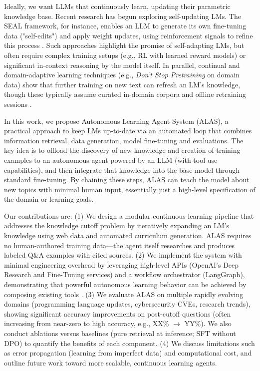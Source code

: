 \documentclass[11pt]{article}
\begin{document}
Ideally, we want LLMs that continuously learn, updating their parametric knowledge base. Recent research has begun exploring self-updating LMs. The SEAL framework, for instance, enables an LLM to generate its own fine-tuning data ("self-edits") and apply weight updates, using reinforcement signals to refine this process \citep{seal2025}. Such approaches highlight the promise of self-adapting LMs, but often require complex training setups (e.g., RL with learned reward models) or significant in-context reasoning by the model itself. In parallel, continual and domain-adaptive learning techniques (e.g., \emph{Don’t Stop Pretraining} on domain data) show that further training on new text can refresh an LM’s knowledge, though these typically assume curated in-domain corpora and offline retraining sessions \citep{gururangan2020dontstop}.

In this work, we propose Autonomous Learning Agent System (ALAS), a practical approach to keep LMs up-to-date via an automated loop that combines information retrieval, data generation, model fine-tuning and evaluations. The key idea is to offload the discovery of new knowledge and creation of training examples to an autonomous agent powered by an LLM (with tool-use capabilities), and then integrate that knowledge into the base model through standard fine-tuning. By chaining these steps, ALAS can teach the model about new topics with minimal human input, essentially just a high-level specification of the domain or learning goals.

Our contributions are: (1) We design a modular continuous-learning pipeline that addresses the knowledge cutoff problem by iteratively expanding an LM’s knowledge using web data and automated curriculum generation. ALAS requires no human-authored training data—the agent itself researches and produces labeled Q\&A examples with cited sources. (2) We implement the system with minimal engineering overhead by leveraging high-level APIs (OpenAI’s Deep Research and Fine-Tuning services) and a workflow orchestrator (LangGraph), demonstrating that powerful autonomous learning behavior can be achieved by composing existing tools \citep{openai_platform,langgraph_docs}. (3) We evaluate ALAS on multiple rapidly evolving domains (programming language updates, cybersecurity CVEs, research trends), showing significant accuracy improvements on post-cutoff questions (often increasing from near-zero to high accuracy, e.g., XX\% \(\to\) YY\%). We also conduct ablations versus baselines (pure retrieval at inference; SFT without DPO) to quantify the benefits of each component. (4) We discuss limitations such as error propagation (learning from imperfect data) and computational cost, and outline future work toward more scalable, continuous learning agents.
\end{document}
